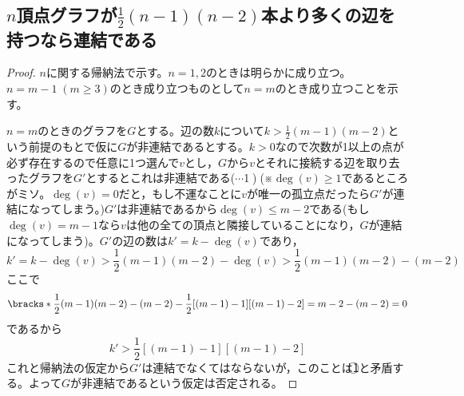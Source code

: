        \subsection{\texorpdfstring{$n$}{n}頂点グラフが\texorpdfstring{$\frac{1}{2}(n-1)(n-2)$}{(n-1)(n-2)/2}本より多くの辺を持つなら連結である}
            \begin{proof}
                $n$に関する帰納法で示す。$n=1,2$のときは明らかに成り立つ。$n=m-1\;(m\geq3)$のとき成り立つものとして$n=m$のとき成り立つことを示す。
                \par
                $n=m$のときのグラフを$G$とする。辺の数$k$について$k>\frac{1}{2}(m-1)(m-2)$という前提のもとで仮に$G$が非連結であるとする。$k>0$なので次数が1以上の点が必ず存在するので任意に1つ選んで$v$とし，$G$から$v$とそれに接続する辺を取り去ったグラフを$G'$とするとこれは非連結である($\cdots$\textcircled{1})。(※$\deg(v)\geq1$であるところがミソ。$\deg(v)=0$だと，もし不運なことに$v$が唯一の孤立点だったら$G'$が連結になってしまう。)$G'$は非連結であるから$\deg(v)\leq m-2$である(もし$\deg(v)=m-1$なら$v$は他の全ての頂点と隣接していることになり，$G$が連結になってしまう)。$G'$の辺の数は$k'=k-\deg(v)$であり，
                \[k' = k-\deg(v) > \frac{1}{2}(m-1)(m-2) - \deg(v) > \frac{1}{2}(m-1)(m-2) - (m-2)\]
                ここで
                \[\bracks*{\frac{1}{2}(m-1)(m-2) - (m-2)} - \frac{1}{2}[(m-1)-1][(m-1)-2] = m-2 - (m-2) = 0\]
                であるから
                \[k' > \frac{1}{2}[(m-1)-1][(m-1)-2]\]
                これと帰納法の仮定から$G'$は連結でなくてはならないが，このことは\textcircled{1}と矛盾する。よって$G$が非連結であるという仮定は否定される。
            \end{proof}
